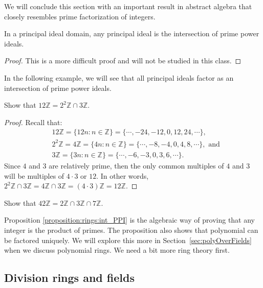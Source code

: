 We will conclude this section with an important result in abstract algebra that closely resembles prime factorization of integers.

\begin{prop}\label{proposition:rings:int_PPI}
In a principal ideal domain, any principal ideal is the intersection of prime power ideals.\\
\end{prop}

\begin{proof}
This is a more difficult proof and will not be studied in this class.
\end{proof}

In the following example, we will see that all principal ideals factor as an intersection of prime power ideals.

\begin{example}
Show that $12{\mathbb Z}=2^2{\mathbb Z}\cap 3{\mathbb Z}$.
\end{example}

\begin{proof}
Recall that:
\begin{align*}
&12{\mathbb Z}=\{12n:n\in{\mathbb Z}\}=\{\cdots,-24,-12,0,12,24,\cdots\},\\
&2^2{\mathbb Z}=4{\mathbb Z}=\{4n:n\in{\mathbb Z}\}=\{\cdots,-8,-4,0,4,8,\cdots\}, \text{ and}\\ &3{\mathbb Z}=\{3n:n\in{\mathbb Z}\}=\{\cdots,-6,-3,0,3,6,\cdots\}.  
\end{align*}
Since $4$ and $3$ are relatively prime, then the only common multiples of $4$ and $3$ will be multiples of $4\cdot 3$ or $12$.  In other words, $2^2{\mathbb Z}\cap 3{\mathbb Z}=4{\mathbb Z}\cap 3{\mathbb Z}=(4\cdot 3){\mathbb Z}=12{\mathbb Z}$.
\end{proof}

\begin{exercise}
Show that $42{\mathbb Z}=2{\mathbb Z}\cap 3{\mathbb Z}\cap 7{\mathbb Z}$.
\end{exercise}

Proposition \ref{proposition:rings:int_PPI} is the algebraic way of proving that any integer is the product of primes. The proposition also shows that polynomial can be factored uniquely.  We will explore this more in Section~\ref{sec:polyOverFields} when we discuss polynomial rings.  We need a bit more ring theory first.

\subsection{Division rings and fields\quad
{}}



